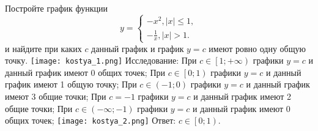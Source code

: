 \documentclass{article}
\begin{document}
	Постройте график функции\newline
	$$
		y =
		\begin{cases}
			-x^2, |x| \leq 1, \\
			-\frac{1}{x}, |x| > 1.
		\end{cases}
	$$
	\newline и найдите при каких $c$ данный график и график $ y = c $ имеют
	ровно одну общую точку.
	\newline\texttt{[image: kostya\_1.png]} \newline
	Исследование:
	\newline\space При $c \in \left[ 1; +\infty \right)$ графики 
	$ y = c $ и данный график имеют 0 общих точек;
	\newline\space При $c \in \left[ 0; 1 \right)$ графики $ y = c $
	и данный график имеют 1 общую точку;
	\newline\space При $c \in \left( -1; 0 \right)$ графики $ y = c $
	и данный график имеют 3 общие точки;
	\newline\space При $c = -1$ графики $ y = c $
	и данный график имеют 2 общие точки;
	\newline\space При $c \in \left( -\infty; -1 \right)$ графики 
	$ y = c $ и данный график имеют 0 общих точек;
	\newline\texttt{[image: kostya\_2.png]}
	\newline Ответ: $ c \in \left[ 0; 1 \right) $.
	
\end{document}
